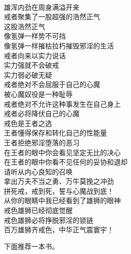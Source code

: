 \begin{poem}[戒出雄狮气场]
    \begin{multicols}{2}
        \begin{center}~\\
            雄浑内劲在周身满溢开来 \\ 戒者聚集了一股超强的浩然正气 \\ 这股浩然正气 \\ 像氢弹一样势不可挡 \\ 像氢弹一样摧枯拉朽摧毁邪淫的生活 \\ 戒者向来以实力说话 \\ 实力强就不会破戒 \\ 实力弱必破无疑 \\ 戒者绝对不会屈服于自己的心魔 \\ 被心魔奴役是一种耻辱 \\ 戒者绝对不允许这种事发生在自己身上 \\ 戒者必将降伏自己的心魔 \\ 戒色是王者之选 \\ 王者懂得保存和转化自己的性能量 \\ 王者拒绝邪淫堕落的恶习 \\ 在王者的眼中你会看见坚定无比的决心 \\ 在王者的眼中你看不见任何的妥协和退却 \\ 请听从内心良知的召唤 \\ 拿出万夫不当之勇、万牛莫挽之冲劲 \\ 拼死戒，戒到死，誓与心魔战到底！ \\ 从你的眼睛中我已经看到了雄狮的眼神 \\ 戒色雄狮已经彻底觉醒 \\ 戒色雄狮必将挣脱邪淫的锁链 \\ 百万雄狮齐戒色，中华正气震寰宇！
        \end{center}
    \end{multicols}
\end{poem}

下面推荐一本书。

